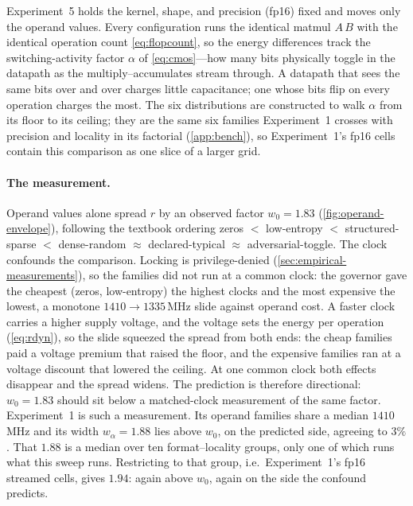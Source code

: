 \documentclass{article}
\theoremstyle{plain}
\theoremstyle{definition}
\theoremstyle{remark}
\begin{document}
Experiment~5 holds the kernel, shape,
and precision (fp16) fixed and moves only the operand values. Every
configuration runs the identical matmul $A\,B$ with the identical operation
count \cref{eq:flopcount}, so the energy differences track the
switching-activity factor $\alpha$ of \cref{eq:cmos}---how many bits
physically toggle in the datapath as the multiply--accumulates stream
through. A datapath that sees the
same bits over and over charges little capacitance; one whose bits flip on
every operation charges the most. The six distributions are constructed to
walk $\alpha$ from its floor to its ceiling; they are the same six families
Experiment~1 crosses with precision and locality in its factorial
(\cref{app:bench}), so Experiment~1's fp16 cells contain this comparison as
one slice of a larger grid.

\paragraph{The measurement.}
Operand values alone spread $r$ by an observed factor
$w_0 = 1.83$ (\cref{fig:operand-envelope}), following the textbook ordering
zeros $<$ low-entropy $<$ structured-sparse $<$ dense-random $\approx$
declared-typical $\approx$ adversarial-toggle. The clock confounds the comparison.
Locking is privilege-denied (\cref{sec:empirical-measurements}), so the families
did not run at a common clock: the governor gave the cheapest (zeros, low-entropy)
the highest clocks and the most expensive the lowest, a monotone
$1410 \to 1335$\,MHz slide against operand cost. A faster clock carries a higher
supply voltage, and the voltage sets the energy per operation (\cref{eq:rdyn}),
so the slide squeezed the spread from both ends: the cheap families paid a
voltage premium that raised the floor, and the expensive families ran at a
voltage discount that lowered the ceiling. At one common clock both effects
disappear and the spread widens. The prediction is therefore directional:
$w_0 = 1.83$ should sit below a matched-clock measurement of the same factor.
Experiment~1 is such a measurement. Its operand families share a median
$1410$\,MHz and its width $w_\alpha = 1.88$ lies above $w_0$, on the predicted
side, agreeing to $3\%$. That $1.88$ is a median over ten format--locality
groups, only one of which runs what this sweep runs. Restricting to that
group, i.e.\ Experiment~1's fp16 streamed cells, gives $1.94$: again above $w_0$,
again on the side the confound predicts.
\end{document}
